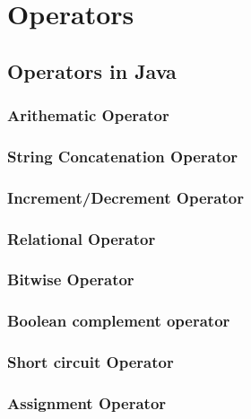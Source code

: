 \documentclass[14pt,fleqn]{extbook} %
\begin{document}
\chapter{Operators}
\section{Operators in Java}
%
\subsection{Arithematic Operator}

\subsection{String Concatenation Operator}

\subsection{Increment/Decrement Operator}

\subsection{Relational Operator}

%
\subsection{Bitwise Operator}

\subsection{Boolean complement operator}

\subsection{Short circuit Operator}

\subsection{Assignment Operator}

\end{document}
